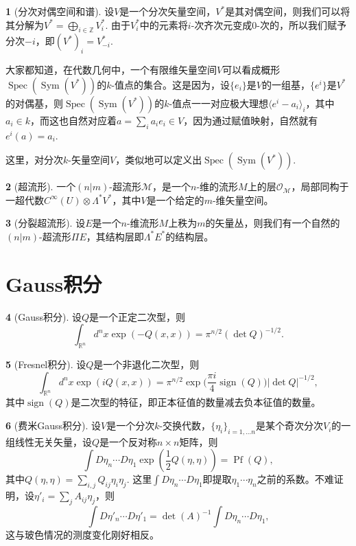 \documentclass[11pt]{article}
\theoremstyle{definition}
\newtheorem{para}{}[section]
\theoremstyle{plain}
\begin{document}
\begin{para}[分次对偶空间和谱]
    设$V$是一个分次矢量空间，$V^*$是其对偶空间，则我们可以将其分解为$V^*=\bigoplus_{i\in\mathbb Z}V_i^*$. 由于$V_i^*$中的元素将$i$-次齐次元变成$0$-次的，所以我们赋予分次$-i$，即$(V^*)_i=V_{-i}^*$.

    大家都知道，在代数几何中，一个有限维矢量空间$V$可以看成概形$\operatorname{Spec}(\operatorname{Sym}(V^*))$的$k$-值点的集合。这是因为，设$\{e_i\}$是$V$的一组基，$\{e^i\}$是$V^*$的对偶基，则$\operatorname{Spec}(\operatorname{Sym}(V^*))$的$k$-值点一一对应极大理想$\langle e^i-a_i\rangle_i$，其中$a_i\in k$，而这也自然对应着$a=\sum_i a_ie_i\in V$，因为通过赋值映射，自然就有$e^i(a)=a_i$.

    这里，对分次$k$-矢量空间$V$，类似地可以定义出$\operatorname{Spec}(\operatorname{Sym}(V^*))$.
\end{para}

\begin{para}[超流形]
一个$(n|m)$-超流形$\mathcal M$，是一个$n$-维的流形$M$上的层$\mathcal O_{\mathcal M}$，局部同构于一超代数$C^\infty(U)\otimes \Lambda^* V^*$，其中$V$是一个给定的$m$-维矢量空间。
\end{para}

\begin{para}[分裂超流形]
设$E$是一个$n$-维流形$M$上秩为$m$的矢量丛，则我们有一个自然的$(n|m)$-超流形$\Pi E$，其结构层即$\Lambda^* E^*$的结构层。
\end{para}

\section{Gauss积分}

\begin{para}[Gauss积分]
    设$Q$是一个正定二次型，则
    \[
        \int_{\mathbb R^n}d^nx \exp(-Q(x,x))=\pi^{n/2}(\det Q)^{-1/2}.
    \]
\end{para}

\begin{para}[Fresnel积分]
    设$Q$是一个非退化二次型，则
    \[
        \int_{\mathbb R^n}d^nx \exp(iQ(x,x))=\pi^{n/2}\exp\biggl(\frac{\pi i}{4} \operatorname{sign}(Q)\biggr)|\det Q|^{-1/2},
    \]
    其中$\operatorname{sign}(Q)$是二次型的特征，即正本征值的数量减去负本征值的数量。
\end{para}

\begin{para}[费米Gauss积分]
    设$V$是一个分次$k$-交换代数，$\{\eta_i\}_{i=1,\dots n}$是某个奇次分次$V_i$的一组线性无关矢量，设$Q$是一个反对称$n\times n$矩阵，则
    \[
        \int D\eta_n\cdots D\eta_1 \exp\left(\frac{1}{2}Q(\eta,\eta)\right)=\operatorname{Pf}(Q),
    \]
    其中$Q(\eta,\eta)=\sum_{i,j}Q_{ij}\eta_i\eta_j$.
    这里$\int D\eta_n\cdots D\eta_1$即提取$\eta_1\cdots \eta_n$之前的系数。不难证明，设$\eta'_i=\sum_jA_{ij}\eta_j$，则
    \[
        \int D\eta'_n\cdots D\eta'_1=\det(A)^{-1}\int D\eta_n\cdots D\eta_1,
    \]
    这与玻色情况的测度变化刚好相反。
\end{para}
\end{document}
